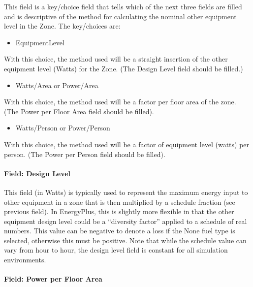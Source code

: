 This field is a key/choice field that tells which of the next three fields are filled and is descriptive of the method for calculating the nominal other equipment level in the Zone. The key/choices are:

\begin{itemize}
\tightlist
\item
  EquipmentLevel
\end{itemize}

With this choice, the method used will be a straight insertion of the other equipment level (Watts) for the Zone. (The Design Level field should be filled.)

\begin{itemize}
\tightlist
\item
  Watts/Area or Power/Area
\end{itemize}

With this choice, the method used will be a factor per floor area of the zone. (The Power per Floor Area field should be filled).

\begin{itemize}
\tightlist
\item
  Watts/Person or Power/Person
\end{itemize}

With this choice, the method used will be a factor of equipment level (watts) per person. (The Power per Person field should be filled).

\paragraph{Field: Design Level}\label{field-design-level-4}

This field (in Watts) is typically used to represent the maximum energy input to other equipment in a zone that is then multiplied by a schedule fraction (see previous field). In EnergyPlus, this is slightly more flexible in that the other equipment design level could be a ``diversity factor'' applied to a schedule of real numbers. This value can be negative to denote a loss if the None fuel type is selected, otherwise this must be positive. Note that while the schedule value can vary from hour to hour, the design level field is constant for all simulation environments.

\paragraph{Field: Power per Floor Area}\label{field-power-per-zone-floor-area-3}

